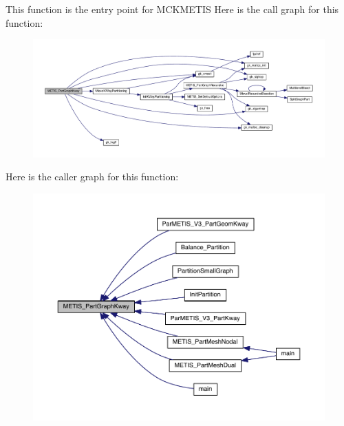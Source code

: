 This function is the entry point for M\+C\+K\+M\+E\+T\+IS Here is the call graph for this function\+:\nopagebreak
\begin{figure}[H]
\begin{center}
\leavevmode
\includegraphics[width=350pt]{a00909_af89851458c047aba436b36ed567441e4_cgraph}
\end{center}
\end{figure}
Here is the caller graph for this function\+:\nopagebreak
\begin{figure}[H]
\begin{center}
\leavevmode
\includegraphics[width=350pt]{a00909_af89851458c047aba436b36ed567441e4_icgraph}
\end{center}
\end{figure}
\mbox{\label{a00909_a7973c78504ad6711d3516082b1112805}} 
